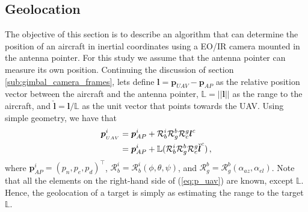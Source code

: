 \pagebreak
\subsection{Geolocation}{\label{geolocation}}
The objective of this section is to describe an algorithm that can determine the position of an aircraft in inertial coordinates using a EO/IR camera mounted in the antenna pointer. For this study we assume that the antenna pointer can measure its own position.
Continuing the discussion of section \ref{sub:gimbal_camera_frames}, lets define $\boldsymbol{l}=\boldsymbol{p}_{UAV}-\boldsymbol{p}_{AP}$ as the relative position vector between the aircraft and the antenna pointer, $\mathbb{L}=\lvert\lvert \boldsymbol{l}\rvert\rvert$ as the range to the aircraft, and $\check{\boldsymbol{l}}=\boldsymbol{l}/\mathbb{L}$ as the unit vector that points towards the UAV. Using simple geometry, we have that
\begin{align}{\label{eq:p_uav}}
\boldsymbol{p}_{_{UAV}}^i&=\boldsymbol{p}_{AP}^i+\mathcal{R}_b^i\mathcal{R}_g^b\mathcal{R}_c^g\boldsymbol{l}^c\nonumber \\
&= \boldsymbol{p}_{AP}^i+\mathbb{L}(\mathcal{R}_b^i\mathcal{R}_g^b\mathcal{R}_c^g\check{\boldsymbol{l}}^c)\,,
\end{align}
where $\boldsymbol{p}_{AP}^i=(p_n,p_e,p_d)^\top$, $\mathcal{R}_b^i=\mathcal{R}_b^i(\phi,\theta,\psi)$, and $\mathcal{R}_g^b=\mathcal{R}_g^b(\alpha_{az},\alpha_{el})$. Note that all the elements on the right-hand side of (\ref{eq:p_uav}) are known, except $\mathbb{L}$. Hence, the geolocation of a target is simply as estimating the range to the target $\mathbb{L}$.

